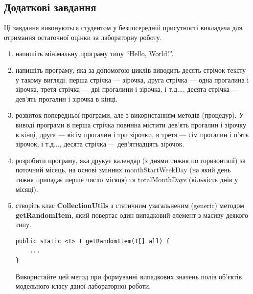 \subsection{Додаткові завдання}
Ці завдання виконуються студентом у безпосередній присутності викладача для отримання остаточної оцінки за лабораторну роботу.
\begin{enumerate}
\item напишіть мінімальну програму типу ``Hello, World!''.
\item напишіть програму, яка за допомогою циклів виводить десять стрічок тексту у такому вигляді: перша стрічка --- зірочка, друга стрічка --- одна прогалина і зірочка, третя стрічка --- дві прогалини і зірочка, і т.д..., десята стрічка --- дев’ять прогалин і зірочка в кінці.
\item розвиток попередньої програми, але з використанням методів (процедур). У виводі програми в перша стрічка повинна містити дев’ять прогалин і зірочку в кінці, друга --- вісім прогалин і три зірочки, в третя --- сім прогалин і п’ять зірочок, і т.д..., десята стрічка --- дев’ятнадцять зірочок.
\item розробити програму, яка друкує календар (з днями тижня по горизонталі) 
за поточний місяць, на основі змінних monthStartWeekDay (на який день тижня
припадає перше число місяця) та totalMonthDays (кількість днів у місяці).
\item створіть клас {\bf CollectionUtils} з статичним узагальненим 
(generic) методом {\bf getRandomItem}, який повертає один випадковий 
елемент з масиву деякого типу. 
\begin{lstlisting}
public static <T> T getRandomItem(T[] all) {
    ...
}
\end{lstlisting}
Використайте цей метод при формуванні випадкових значень полів об’єктів 
модельного класу даної лабораторної роботи.


\end{enumerate}
